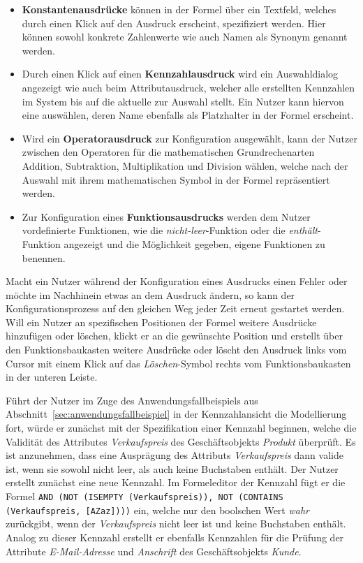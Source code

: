\documentclass[
  language=german, %
  type=bachelor,%
  ngerman
]{isthesis}
\begin{document}
\begin{content}
\begin{itemize}
    \item  \textbf{Konstantenausdrücke} können in der Formel über ein
      Textfeld, welches durch einen Klick auf den Ausdruck erscheint,
      spezifiziert werden. Hier können sowohl konkrete Zahlenwerte wie auch
      Namen als Synonym genannt werden.

    \item Durch einen Klick auf einen \textbf{Kennzahlausdruck} wird ein
      Auswahldialog angezeigt wie auch beim Attributausdruck, welcher alle
      erstellten Kennzahlen im System bis auf die aktuelle zur Auswahl stellt.
      Ein Nutzer kann hiervon eine auswählen, deren Name ebenfalls als
      Platzhalter in der Formel erscheint.  

    \item Wird ein \textbf{Operatorausdruck} zur Konfiguration ausgewählt,
      kann der Nutzer zwischen den Operatoren für die mathematischen
      Grundrechenarten Addition, Subtraktion, Multiplikation und Division
      wählen, welche nach der Auswahl mit ihrem mathematischen Symbol in der Formel
      repräsentiert werden.

    \item Zur Konfiguration eines \textbf{Funktionsausdrucks} werden dem Nutzer
      vordefinierte Funktionen, wie \zB{} die \textit{nicht-leer}-Funktion oder
      die \textit{enthält}-Funktion angezeigt und die Möglichkeit gegeben,
      eigene Funktionen zu benennen.
  \end{itemize}

  Macht ein Nutzer während der Konfiguration eines Ausdrucks einen Fehler oder
  möchte im Nachhinein etwas an dem Ausdruck ändern, so kann der
  Konfigurationsprozess auf den gleichen Weg jeder Zeit erneut gestartet
  werden.  Will ein Nutzer an spezifischen Positionen der Formel weitere
  Ausdrücke hinzufügen oder löschen, klickt er an die gewünschte Position und
  erstellt über den Funktionsbaukasten weitere Ausdrücke oder löscht den
  Ausdruck links vom Cursor mit einem Klick auf das \textit{Löschen}-Symbol
  rechts vom Funktionsbaukasten in der unteren Leiste.

  Führt der Nutzer im Zuge des Anwendungsfallbeispiels aus
  Abschnitt~\ref{sec:anwendungsfallbeispiel} in der Kennzahlansicht die
  Modellierung fort, würde er zunächst mit der Spezifikation einer Kennzahl
  beginnen, welche die Validität des Attributes \textit{Verkaufspreis} des
  Geschäftsobjekts \textit{Produkt} überprüft. Es ist anzunehmen, dass eine
  Ausprägung des Attributs \textit{Verkaufspreis} dann valide ist, wenn sie
  sowohl nicht leer, als auch keine Buchstaben enthält. Der Nutzer erstellt
  zunächst eine neue Kennzahl. Im Formeleditor der Kennzahl fügt er die Formel
  \texttt{AND (NOT (ISEMPTY (Verkaufspreis)), NOT (CONTAINS (Verkaufspreis,
  [A\textminus{}Za\textminus{}z])))} ein, welche nur den boolschen Wert
  \textit{wahr} zurückgibt, wenn der \textit{Verkaufspreis} nicht leer ist und
  keine Buchstaben enthält. Analog zu dieser Kennzahl erstellt er ebenfalls
  Kennzahlen für die Prüfung der Attribute \textit{E-Mail-Adresse} und
  \textit{Anschrift} des Geschäftsobjekts \textit{Kunde}.


\end{content}
\end{document}
